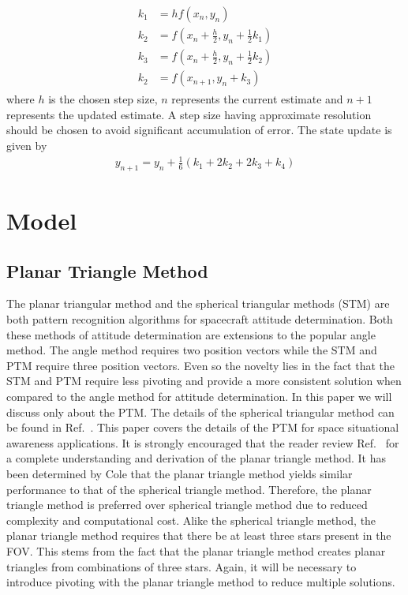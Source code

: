 \documentclass[]{aiaa-tc}%
\begin{document}
\begin{subequations}
\begin{gather}
\label{eq:range_kutta}
\begin{aligned}
k_1 &= hf(x_n,y_n)\\
k_2 &= f(x_n+\frac{h}{2},y_n+\frac{1}{2}k_1)\\
k_3 &= f(x_n+\frac{h}{2},y_n+\frac{1}{2}k_2)\\
k_2 &= f(x_{n+1},y_n+k_3)
\end{aligned}
\end{gather}
\end{subequations}
where $h$ is the chosen step size, $n$ represents the current estimate and $n+1$ represents the updated estimate. A step size having approximate resolution should be chosen to avoid significant accumulation of error. The state update is given by
\begin{align}
y_{n+1}=y_n+\frac{1}{6}(k_1+2k_2+2k_3+k_4)
\end{align}
\section{Model}
\label{model}

\subsection{Planar Triangle Method}

The planar triangular method and the spherical triangular methods (STM) are both pattern recognition algorithms for spacecraft attitude determination. Both these methods of attitude determination are extensions to the popular angle method. The angle method requires two position vectors while the STM and PTM require three position vectors. Even so the novelty lies in the fact that the STM and PTM require less pivoting and provide a more consistent solution when compared to the angle method for attitude determination. In this paper we will discuss only about the PTM. The details of the spherical triangular method can be found in Ref.~. This paper covers the details of the PTM for space situational awareness applications. It is strongly encouraged that the reader review Ref.~ for a complete understanding and derivation of the planar triangle method. It has been determined by Cole that the planar triangle method yields similar performance to that of the spherical triangle method\cite{PTM}. Therefore, the planar triangle method is preferred over spherical triangle method due to reduced complexity and computational cost. Alike the spherical triangle method, the planar triangle method requires that there be at least three stars present in the FOV. This stems from the fact that the planar triangle method creates planar triangles from combinations of three stars. Again, it will be necessary to introduce pivoting with the planar triangle method to reduce multiple solutions.\\
\end{document}
